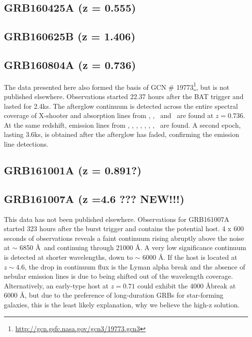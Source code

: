 \documentclass{aa}    %
\begin{document}
\subsection{GRB160425A (z = 0.555)}	



\subsection{GRB160625B (z = 1.406)}	



\subsection{GRB160804A (z = 0.736)}
The data presented here also formed the basis of GCN \#
19773\footnote{\url{http://gcn.gsfc.nasa.gov/gcn3/19773.gcn3}}, but is not
published elsewhere. Observations started 22.37 hours after the BAT trigger and
lasted for 2.4ks. The afterglow continuum is detected across the entire
spectral coverage of X-shooter and absorption lines from \mgi, \mgii, \feii~and
\alii~are found at $z = 0.736$. At the same redshift, emission lines from \oii,
\oiii, \ha, \hb, \hg, \nii, \sii, \siii~are found. A second epoch, lasting
3.6ks, is obtained after the afterglow has faded, confirming the emission line
detections.


\subsection{GRB161001A (z = 0.891?)}	



\subsection{GRB161007A (z =4.6 ??? NEW!!!)}
This data has not been published elsewhere. Observations for GRB161007A started
323 hours after the burst trigger and contains the potential host. 4 x 600 seconds
of observations reveals a faint continuum rising abruptly above the noise at
$\sim$ 6850 \AA~and continuing through 21000 \AA. A very low significance
continuum is detected at shorter wavelengths, down to $\sim$ 6000 \AA. If the
host is located at $z \sim 4.6$, the drop in continuum flux is the Lyman alpha
break and the absence of nebular emission lines is due to \oii being shifted
out of the wavelength coverage. Alternatively, an early-type host at $z = 0.71$
could exhibit the 4000 \AA break at 6000 \AA, but due to the preference of
long-duration GRBs for star-forming galaxies, this is the least likely
explanation, why we believe the high-z solution.
\end{document}
